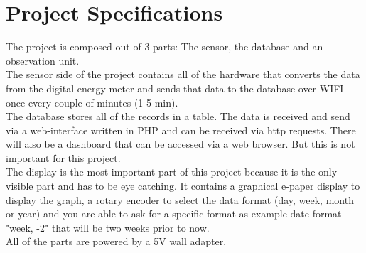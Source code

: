 \documentclass[a4paper,twoside, 12pt]{report}
\theoremstyle{break}
\begin{document}
\section{Project Specifications}
The project is composed out of 3 parts: The sensor, the database and an observation unit. \ \\
The sensor side of the project contains all of the hardware that converts the data from the digital energy meter and sends that data to the database over WIFI once every couple of minutes (1-5 min).
\ \\
The database stores all of the records in a table. The data is received and send via a web-interface written in PHP and can be received via http requests. There will also be a dashboard that can be accessed via a web browser. But this is not important for this project.
\ \\
The display is the most important part of this project because it is the only visible part and has to be eye catching. It contains a graphical e-paper display to display the graph, a rotary encoder to select the data format (day, week, month or year) and you are able to ask for a specific format as example date format "week, -2" that will be two weeks prior to now.
\ \\
All of the parts are powered by a 5V wall adapter.


\begin{landscape}

\end{landscape}

\begin{landscape}

\end{landscape}
\end{document}
